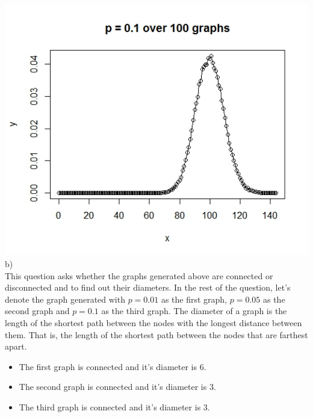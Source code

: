 \documentclass{article}
\begin{document}
\includegraphics[scale=0.4]{pa12} \\
b)\\
This question asks whether the graphs generated above are connected or disconnected and to find out their diameters.
In the rest of the question, let's denote the graph generated with $p=0.01$ as the first graph,
$p=0.05$ as the second graph and $p=0.1$ as the third graph. The diameter of a graph is the length of the shortest path 
between the nodes with the longest distance between them. That is, the length of the shortest path between the nodes
that are farthest apart.
\begin{itemize}
 \item 
 The first graph is connected and it's diameter is 6.
 \item
 The second graph is connected and it's diameter is 3.
 \item
 The third graph is connected and it's diameter is 3.
\end{itemize}
\end{document}
